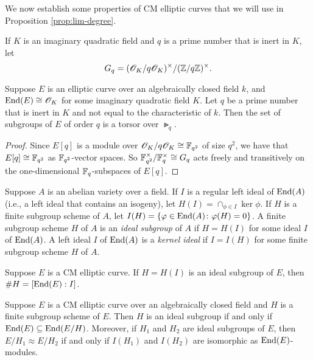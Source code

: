 \documentclass{amsart}
\begin{document}
We now establish some properties of CM elliptic curves that we will use in Proposition \ref{prop:lim-degree}.
\begin{definition}
  If $K$ is an imaginary quadratic field and $q$ is a prime number that is inert in $K$, let
  $$G_q=(\mathscr{O}_K/q\mathscr{O}_K)^\times/(\mathbb{Z}/q\mathbb{Z})^\times. $$
\end{definition}

\begin{lemma}\label{lem:c-torsor}
  Suppose $E$ is an elliptic curve over an algebraically closed field $k$, and $\operatorname{End}(E) \cong \mathscr{O}_K$ for some imaginary quadratic field $K$. Let $q$ be a prime number that is inert in $K$ and not equal to the characteristic of $k$. Then the set of subgroups of $E$ of order $q$ is a torsor over $\Gt_q$.
\end{lemma}
\begin{proof}
  Since $E[q]$ is a module over $\mathscr{O}_K/q\mathscr{O}_K \cong \mathbb{F}_{q^2}$  of size $q^2$, we have that $E[q] \cong \mathbb{F}_{q^2}$ as $\mathbb{F}_{q^2}$-vector spaces. So $\mathbb{F}_{q^2}^\times/\mathbb{F}_q^\times \cong G_q$ acts freely and transitively on the one-dimensional $\mathbb{F}_q$-subspaces of $E[q]$.
\end{proof}

\begin{definition}\label{def:ker-idl}
  Suppose $A$ is an abelian variety over a field. If $I$ is a regular left ideal of $\operatorname{End}(A)$ (i.e., a left ideal that contains an isogeny), let $H(I) = \cap_{\phi \in I}\ker \phi$. If $H$ is a finite subgroup scheme of $A$, let $I(H) = \{\varphi \in \operatorname{End}(A) \colon \varphi(H) = 0\}$. A finite subgroup scheme $H$ of $A$ is an \emph{ideal subgroup} of $A$ if $H = H(I)$ for some ideal $I$ of $\operatorname{End}(A)$. A left ideal $I$ of $\operatorname{End}(A)$ is a \emph{kernel ideal} if $I = I(H)$ for some finite subgroup scheme $H$ of $A$.
\end{definition}

\begin{lemma}\label{lemma:order-ideal-subgroup}
  Suppose $E$ is a CM elliptic curve. If $H = H(I)$ is an ideal subgroup of $E$, then $\# H = [\operatorname{End}(E):I]$.
\end{lemma}

\begin{theorem}\label{thm:kani-20b}
  Suppose $E$ is a CM elliptic curve over an algebraically closed field and $H$ is a finite subgroup scheme of $E$. Then $H$ is an ideal %
  subgroup if and only if %
  $\operatorname{End}(E) \subseteq \operatorname{End}(E/H)$. Moreover, if $H_1$ and $H_2$ are ideal subgroups of $E$, then $E/H_1 \approx E/H_2$ if and only if $I(H_1)$ and $I(H_2)$ are isomorphic as $\operatorname{End}(E)$-modules.
\end{theorem}
\end{document}
